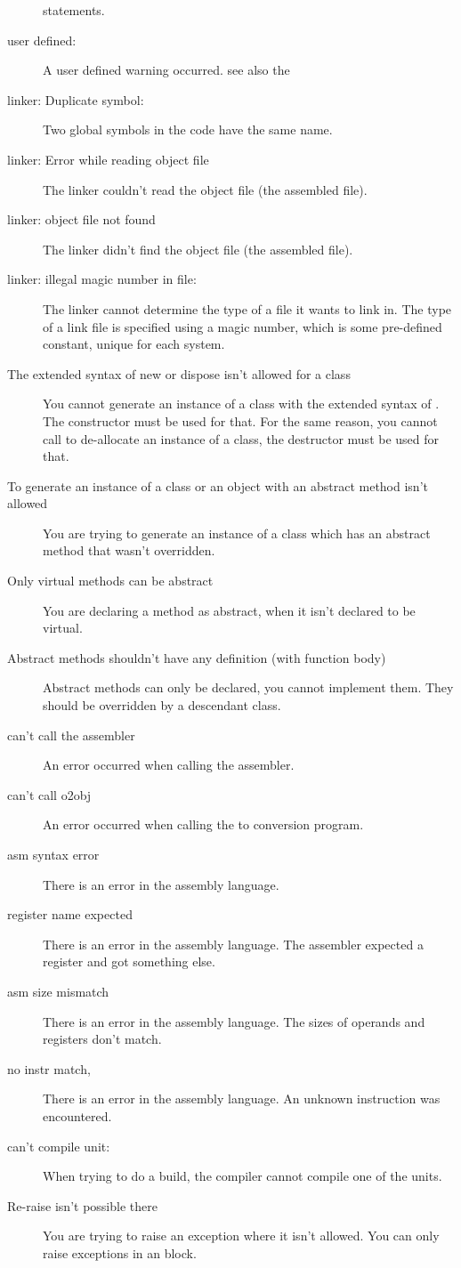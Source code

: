 \documentclass{report}
\begin{document}
\begin{description}
statements.
\item [user defined:]
A user defined warning occurred. see also the \progref
\item [linker: Duplicate symbol:]
Two global symbols in the code have the same name.
\item [linker: Error while reading object file]
The linker couldn't read the object file (the assembled file).
\item [linker: object file not found]
The linker didn't find the object file (the assembled file).
\item [linker: illegal magic number in file:]
The linker cannot determine the type of a file it wants to link in. The type
of a link file is specified using a magic number, which is some pre-defined
constant, unique for each system.
\item [The extended syntax of new or dispose isn't allowed for a class]
You cannot generate an instance of a class with the extended syntax of 
. The constructor must be used for that. For the same reason, you
cannot call  to de-allocate an instance of a class, the
destructor must be used for that.
\item [To generate an instance of a class or an object with an abstract method isn't allowed]
You are trying to generate an instance of a class which has an abstract
method that wasn't overridden.
\item [Only virtual methods can be abstract]
You are declaring a method as abstract, when it isn't declared to be
virtual.
\item [Abstract methods shouldn't have any definition (with function body)]
Abstract methods can only be declared, you cannot implement them. They
should be overridden by a descendant class.
\item [can't call the assembler]
An error occurred when calling the assembler.
\item [can't call o2obj]
An error occurred when calling the  to  conversion program.
\item [asm syntax error]
There is an error in the assembly language.
\item [register name expected]
There is an error in the assembly language. The assembler expected a
register and got something else.
\item [asm size mismatch]
There is an error in the assembly language. The sizes of operands and
registers don't match.
\item [no instr match,]
There is an error in the assembly language. An unknown instruction was
encountered.
\item [can't compile unit:]
When trying to do a build, the compiler cannot compile one of the units.
\item [Re-raise isn't possible there]
You are trying to raise an exception where it isn't allowed. You can only
raise exceptions in an  block.
\end{description}
\end{document}
